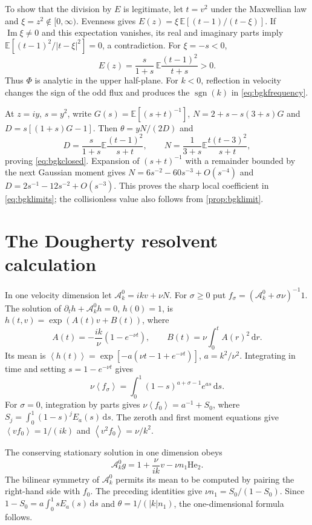\documentclass[11pt]{article}
\newcommand{\dd}{\,\mathrm d}
\newcommand{\av}[1]{\left\langle #1\right\rangle}
\newcommand{\A}{\mathcal A}
\newcommand{\He}{\mathrm{He}}
\newcommand{\sgn}{\operatorname{sgn}}
\newcommand{\Imag}{\operatorname{Im}}
\theoremstyle{definition}
\theoremstyle{remark}
\numberwithin{equation}{section}
\begin{document}
To show that the division by $E$ is legitimate, let $t=v^2$ under
the Maxwellian law and $\xi=z^2\notin[0,\infty)$.
Evenness gives
$E(z)=\xi\,\mathbb E[(t-1)/(t-\xi)]$.
If $\Imag\xi\ne0$ and this expectation vanishes, its real and
imaginary parts imply
$\mathbb E[(t-1)^2/|t-\xi|^2]=0$, a contradiction.
For $\xi=-s<0$,
\[
 E(z)=\frac{s}{1+s}\,
        \mathbb E\frac{(t-1)^2}{t+s}>0.
\]
Thus $\Phi$ is analytic in the upper half-plane.
For $k<0$, reflection in velocity changes the sign of the odd flux
and produces the $\sgn(k)$ in \eqref{eq:bgkfrequency}.

At $z=iy$, $s=y^2$, write
$G(s)=\mathbb E[(s+t)^{-1}]$,
$N=2+s-s(3+s)G$ and $D=s[(1+s)G-1]$.
Then $\theta=yN/(2D)$ and
\[
 D=\frac{s}{1+s}\mathbb E\frac{(t-1)^2}{s+t},\qquad
 N=\frac1{3+s}\mathbb E\frac{t(t-3)^2}{s+t},
\]
proving \eqref{eq:bgkclosed}.
Expansion of $(s+t)^{-1}$ with a remainder bounded by the next
Gaussian moment gives
$N=6s^{-2}-60s^{-3}+O(s^{-4})$ and
$D=2s^{-1}-12s^{-2}+O(s^{-3})$.
This proves the sharp local coefficient in \eqref{eq:bgklimits};
the collisionless value also follows from
\cref{prop:bgklimit}.

\section{The Dougherty resolvent calculation}\label{app:dougherty}

In one velocity dimension let $\A_k^0=ikv+\nu N$.
For $\sigma\geq0$ put $f_\sigma=(\A_k^0+\sigma\nu)^{-1}1$.
The solution of $\partial_th+\A_k^0h=0$, $h(0)=1$, is
$h(t,v)=\exp(A(t)v+B(t))$, where
\[
 A(t)=-\frac{ik}{\nu}(1-e^{-\nu t}),\qquad
 B(t)=\nu\int_0^t A(r)^2\dd r.
\]
Its mean is
$\av{h(t)}=\exp[-a(\nu t-1+e^{-\nu t})]$, $a=k^2/\nu^2$.
Integrating in time and setting $s=1-e^{-\nu t}$ gives
\begin{equation}
 \nu\av{f_\sigma}
   =\int_0^1(1-s)^{a+\sigma-1}e^{as}\dd s.
 \label{eq:OU}
\end{equation}
For $\sigma=0$, integration by parts gives
$\nu\av{f_0}=a^{-1}+S_0$, where
$S_j=\int_0^1(1-s)^jE_a(s)\dd s$.
The zeroth and first moment equations give
$\av{vf_0}=1/(ik)$ and $\av{v^2f_0}=\nu/k^2$.

The conserving stationary solution in one dimension obeys
\[
 \A_k^0g=1+\frac{\nu}{ik}v-\nu n_1\He_2.
\]
The bilinear symmetry of $\A_k^0$ permits its mean to be computed
by pairing the right-hand side with $f_0$.
The preceding identities give
$\nu n_1=S_0/(1-S_0)$.
Since
$1-S_0=a\int_0^1sE_a(s)\dd s$ and
$\theta=1/(|k|n_1)$, the one-dimensional formula follows.
\end{document}
